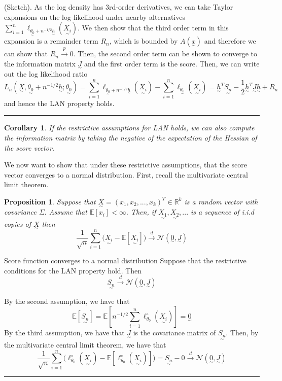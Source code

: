 \documentclass[twoside]{article}
\newtheorem{proposition}[theorem]{Proposition}
\newtheorem{corollary}[theorem]{Corollary}
\newenvironment{proof}{{\bf Proof:}}{\hfill\rule{2mm}{2mm}}
\newcommand{\utilde}{\underset{\sim}}
\begin{document}
\begin{proof}(Sketch). As the log density has 3rd-order derivatives, we can take Taylor expansions on the log likelihood under nearby alternatives $
\sum_{i=1}^{n}\ell_{\utilde{\theta_0} + n^{-1/2}\utilde{h}}(\utilde{X_i})$. We then show that the third order term in this expansion is a remainder term $R_n$, which is bounded by $A(\utilde{x})$ and therefore we can show that $R_n \xrightarrow{p} 0.$ Then, the second order term can be shown to converge to the information matrix $\utilde{J}$ and the first order term is the score. Then, we can write out the log likelihood ratio 
$$
L_n(\utilde{X}, \utilde{\theta_0} + n^{-1/2}\utilde{h}; \utilde{\theta_0}) = \sum_{i=1}^{n}\ell_{\utilde{\theta_0} + n^{-1/2}\utilde{h}}(\utilde{X_i}) - \sum_{i=1}^{n}\ell_{\utilde{\theta_0}}(\utilde{X_i}) = \utilde{h}^T\utilde{S_n} - \frac{1}{2}\utilde{h}^T\utilde{J}\utilde{h} + R_n
$$
and hence the LAN property holds.
\end{proof}

\begin{corollary}If the restrictive assumptions for LAN holds, we can also compute the information matrix by taking the negative of the expectation of the Hessian of the score vector.
\end{corollary}

We now want to show that under these restrictive assumptions, that the score vector converges to a normal distribution. First, recall the multivariate central limit theorem.
\begin{proposition} Suppose that $\utilde{X} = (x_1, x_2, ..., x_k)^T \in \mathbb{R}^k$ is a random vector with covariance $\Sigma.$ Assume that $\mathbb{E}[x_i] < \infty.$ Then, if $\utilde{X_1}, \utilde{X_2}, ...$ is a sequence of i.i.d copies of $\utilde{X}$ then 
$$
\frac{1}{\sqrt{n}} \sum_{i=1}^{n} \bigg(\utilde{X_i} - \mathbb{E}[\utilde{X_i}] \bigg) \xrightarrow{d} \mathcal{N}(\utilde{0}, \utilde{J})
$$
\end{proposition}

\begin{proposition_exam}{Score function converges to a normal distribution}{} Suppose that the restrictive conditions for the LAN property hold. Then 
$$
\utilde{S_n} \xrightarrow{d} \mathcal{N}(\utilde{0}, \utilde{J})
$$
\end{proposition_exam}
\begin{proof} By the second assumption, we have that 
$$
\mathbb{E}[\utilde{S_n}] = \mathbb{E}[n^{-1/2}\sum_{i=1}^{n}\ell_{\theta_{0}}^{\circ}(\utilde{X_i})] = \utilde{0}
$$
By the third assumption, we have that $\utilde{J}$ is the covariance matrix of $\utilde{S_n}$. Then, by the multivariate central limit theorem, we have that 
$$
\frac{1}{\sqrt{n}} \sum_{i=1}^{n} \bigg(\ell_{\theta_{0}}^{\circ}(\utilde{X_i}) - \mathbb{E}[\ell_{\theta_{0}}^{\circ}(\utilde{X_i})] \bigg) =\utilde{S_n} - 0 \xrightarrow{d} \mathcal{N}(\utilde{0}, \utilde{J})
$$
\end{proof}
\end{document}
